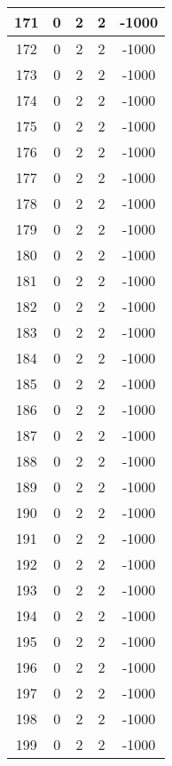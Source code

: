 \documentclass[letterpaper, 12pt]{article}
\begin{document}
\begin{longtable}{|c|c|c|c|c|}
\hline
171 & 0 & 2 & 2 & -1000 \\
\hline
172 & 0 & 2 & 2 & -1000 \\
\hline
173 & 0 & 2 & 2 & -1000 \\
\hline
174 & 0 & 2 & 2 & -1000 \\
\hline
175 & 0 & 2 & 2 & -1000 \\
\hline
176 & 0 & 2 & 2 & -1000 \\
\hline
177 & 0 & 2 & 2 & -1000 \\
\hline
178 & 0 & 2 & 2 & -1000 \\
\hline
179 & 0 & 2 & 2 & -1000 \\
\hline
180 & 0 & 2 & 2 & -1000 \\
\hline
181 & 0 & 2 & 2 & -1000 \\
\hline
182 & 0 & 2 & 2 & -1000 \\
\hline
183 & 0 & 2 & 2 & -1000 \\
\hline
184 & 0 & 2 & 2 & -1000 \\
\hline
185 & 0 & 2 & 2 & -1000 \\
\hline
186 & 0 & 2 & 2 & -1000 \\
\hline
187 & 0 & 2 & 2 & -1000 \\
\hline
188 & 0 & 2 & 2 & -1000 \\
\hline
189 & 0 & 2 & 2 & -1000 \\
\hline
190 & 0 & 2 & 2 & -1000 \\
\hline
191 & 0 & 2 & 2 & -1000 \\
\hline
192 & 0 & 2 & 2 & -1000 \\
\hline
193 & 0 & 2 & 2 & -1000 \\
\hline
194 & 0 & 2 & 2 & -1000 \\
\hline
195 & 0 & 2 & 2 & -1000 \\
\hline
196 & 0 & 2 & 2 & -1000 \\
\hline
197 & 0 & 2 & 2 & -1000 \\
\hline
198 & 0 & 2 & 2 & -1000 \\
\hline
199 & 0 & 2 & 2 & -1000 \\
\hline
\end{longtable}
\end{document}
